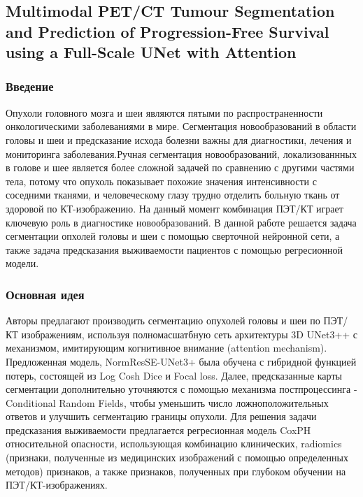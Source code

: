 \subsection*{Multimodal PET/CT Tumour
Segmentation and Prediction of
Progression-Free Survival using a
Full-Scale UNet with Attention}

\subsubsection*{Введение}
Опухоли головного мозга и шеи являются пятыми по распространенности 
онкологическими заболеваниями в мире. Сегментация новообразований 
в области головы и шеи и предсказание исхода болезни важны 
для диагностики, лечения и мониторинга заболевания.Ручная сегментация
новообразований, локализованнных в голове и шее является более сложной задачей по 
сравнению с другими частями тела, потому что опухоль показывает похожие 
значения интенсивности с соседними тканями, и человеческому глазу трудно отделить 
больную ткань от здоровой по КТ-изображению. На данный момент комбинация ПЭТ/КТ 
играет ключевую роль в диагностике новообразований. В данной работе
решается задача сегментации опхолей головы и шеи с помощью 
сверточной нейронной сети, а также задача предсказания выживаемости пациентов с помощью 
регресионной модели. \par 
\subsubsection*{Основная идея}
Авторы предлагают \cite{NormRes} производить сегментацию опухолей головы и шеи по ПЭТ/КТ 
изображениям, используя полномасшатбную сеть архитектуры 3D UNet3++ \cite{Unet} с механизмом,
имитирующим когнитивное внимание (attention mechanism).  Предложенная модель, 
NormResSE-UNet3+ была обучена с гибридной функцией потерь, состоящей из Log Cosh Dice и Focal loss. 
Далее, предсказанные карты сегментации дополнительно уточняются с помощью механизма постпроцессинга -
Conditional Random Fields, чтобы уменьшить число ложноположительных ответов 
и улучшить сегментацию границы опухоли. Для решения задачи предсказания 
выживаемости предлагается регресионная модель CoxPH относительной опасности, использующая 
комбинацию клинических, radiomics (признаки, полученные из медицинских изображений с помощью определенных методов) признаков, а также признаков, полученных при глубоком обучении на ПЭТ/КТ-изображениях.
\par
